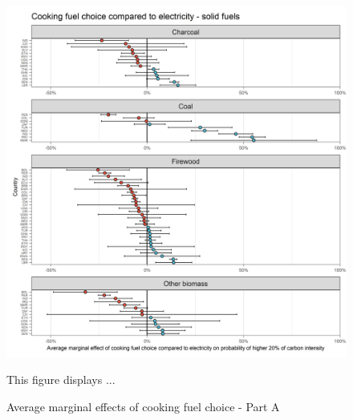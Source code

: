 \documentclass[12pt, a4paper]{article}
\newenvironment{subcaption}
{\strut
\vspace{-5pt}
\begin{minipage}[b]{0.9\textwidth}
  \hspace*{-\parindent}
  \footnotesize}
 {\end{minipage}}
\begin{document}
 \begin{figure}[ht!]
   \centering
   \caption{Average marginal effects of cooking fuel choice - Part A} \label{fig:F6_Electricity_A}
   \includegraphics{Analysis_Logit_Models_Marginal_Effects/Average_Marginal_Effects_affected_upper_80_CF_Electricity A}
   \begin{subcaption}
     This figure displays ...
   \end{subcaption}
 \end{figure}

 \clearpage
\end{document}
